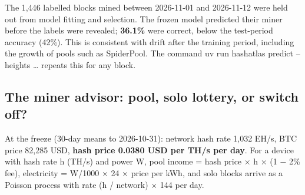 \documentclass[
  11pt,
  a4paper,
]{article}
\newcommand{\code}[1]{{\ttfamily\color{ReportInkTwo}#1}}
\begin{document}
The 1,446 labelled blocks mined between 2026-11-01 and 2026-11-12 were
held out from model fitting and selection. The frozen model predicted
their miner before the labels were revealed; \textbf{36.1\%} were
correct, below the test-period accuracy (42\%). This is consistent with
drift after the training period, including the growth of pools such as
SpiderPool. The command \code{uv run hashatlas predict --heights …}
repeats this for any block.


\subsection{The miner advisor: pool, solo lottery, or switch
off?}\label{the-miner-advisor-pool-solo-lottery-or-switch-off}

At the freeze (30-day means to 2026-10-31): network hash rate 1,032
EH/s, BTC price 82,285 USD, \textbf{hash price 0.0380 USD per TH/s per
day}. For a device with hash rate h (TH/s) and power W, pool income =
hash price × h × (1 − 2\% fee), electricity = W/1000 × 24 × price per
kWh, and solo blocks arrive as a Poisson process with rate (h / network)
× 144 per day.
\end{document}
